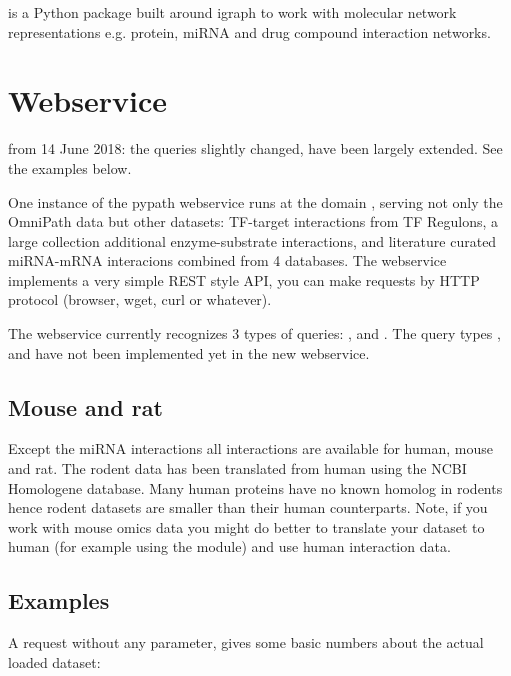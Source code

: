 \documentclass[letterpaper,10pt,english]{sphinxmanual}
\begin{document}
 is a Python package built around igraph to work with molecular
network representations e.g. protein, miRNA and drug compound interaction
networks.


\chapter{Webservice}
\label{\detokenize{index:webservice}}\label{\detokenize{index::doc}}
 from 14 June 2018: the queries slightly changed, have been
largely extended. See the examples below.

One instance of the pypath webservice runs at the domain
, serving not only the OmniPath data but other datasets:
TF-target interactions from TF Regulons, a large collection additional
enzyme-substrate interactions, and literature curated miRNA-mRNA interacions
combined from 4 databases. The webservice implements a very simple REST style
API, you can make requests by HTTP protocol (browser, wget, curl or whatever).

The webservice currently recognizes 3 types of queries: ,
 and . The query types ,  and
 have not been implemented yet in the new webservice.


\section{Mouse and rat}
\label{\detokenize{index:mouse-and-rat}}
Except the miRNA interactions all interactions are available for human, mouse
and rat. The rodent data has been translated from human using the NCBI
Homologene database. Many human proteins have no known homolog in rodents
hence rodent datasets are smaller than their human counterparts. Note, if you
work with mouse omics data you might do better to translate your dataset to
human (for example using the  module) and use human
interaction data.


\section{Examples}
\label{\detokenize{index:examples}}
A request without any parameter, gives some basic numbers about the actual
loaded dataset:
\begin{quote}

\end{quote}
\end{document}
